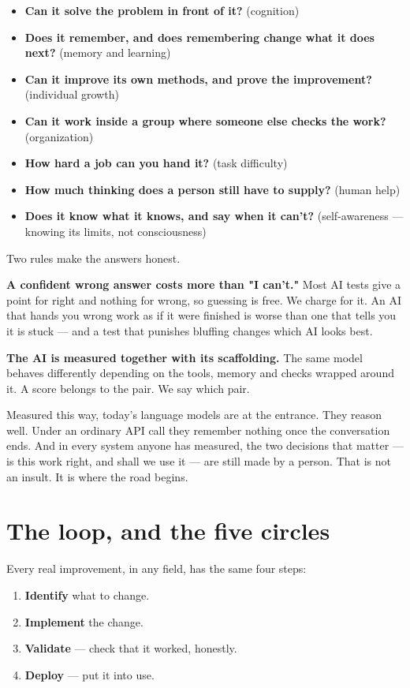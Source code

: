 \documentclass[11pt]{article}
\begin{document}
\begin{itemize}[leftmargin=1.4em,itemsep=2pt]
\item \textbf{Can it solve the problem in front of it?} (cognition)
\item \textbf{Does it remember, and does remembering change what it does next?} (memory and learning)
\item \textbf{Can it improve its own methods, and prove the improvement?} (individual growth)
\item \textbf{Can it work inside a group where someone else checks the work?} (organization)
\item \textbf{How hard a job can you hand it?} (task difficulty)
\item \textbf{How much thinking does a person still have to supply?} (human help)
\item \textbf{Does it know what it knows, and say when it can't?} (self-awareness --- knowing its limits, not consciousness)
\end{itemize}

Two rules make the answers honest.

\textbf{A confident wrong answer costs more than "I can't."} Most AI tests give a point for right and nothing for wrong, so guessing is free. We charge for it. An AI that hands you wrong work as if it were finished is worse than one that tells you it is stuck --- and a test that punishes bluffing changes which AI looks best.

\textbf{The AI is measured together with its scaffolding.} The same model behaves differently depending on the tools, memory and checks wrapped around it. A score belongs to the pair. We say which pair.

Measured this way, today's language models are at the entrance. They reason well. Under an ordinary API call they remember nothing once the conversation ends. And in every system anyone has measured, the two decisions that matter --- is this work right, and shall we use it --- are still made by a person. That is not an insult. It is where the road begins.

\section*{The loop, and the five circles}

Every real improvement, in any field, has the same four steps:

\begin{enumerate}[leftmargin=1.6em,itemsep=2pt]
\item \textbf{Identify} what to change.
\item \textbf{Implement} the change.
\item \textbf{Validate} --- check that it worked, honestly.
\item \textbf{Deploy} --- put it into use.
\end{enumerate}
\end{document}
